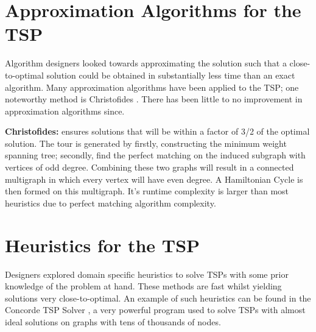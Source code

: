 \documentclass[]{UCD_CS_FYP_Report}
\begin{document}
\section{Approximation Algorithms for the TSP}
Algorithm designers looked towards approximating the solution such that a close-to-optimal solution could be obtained in substantially less time than an exact algorithm. Many approximation algorithms have been applied to the TSP; one noteworthy method is Christofides \cite{JohnMcGe97}. There has been little to no improvement in approximation algorithms since. 

\textbf{Christofides:} ensures solutions that will be within a factor of 3/2 of the optimal solution. The tour is generated by firstly, constructing the minimum weight spanning tree; secondly, find the perfect matching on the induced subgraph with vertices of odd degree. Combining these two graphs will result in a connected multigraph in which every vertex will have even degree. A Hamiltonian Cycle is then formed on this multigraph. It's runtime complexity is larger than most heuristics due to perfect matching algorithm complexity.

\section{Heuristics for the TSP}
Designers explored domain specific heuristics to solve TSPs with some prior knowledge of the problem at hand. These methods are fast whilst yielding solutions very close-to-optimal. An example of such heuristics can be found in the Concorde TSP Solver \cite{davidapplegate2007}, a very powerful program used to solve TSPs with almost ideal solutions on graphs with tens of thousands of nodes.
\end{document}
